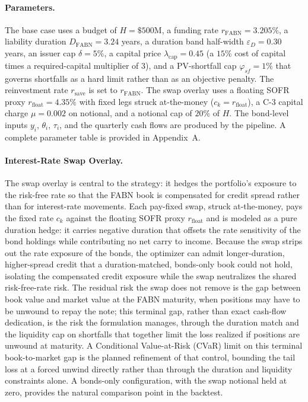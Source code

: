 \documentclass[12pt]{article}
\begin{document}
\paragraph{Parameters.} 

The base case uses a budget of $H = \$500$M, a funding rate $r_{\text{FABN}} = 3.205\%$, a liability duration $D_{\text{FABN}} = 3.24$ years, a duration band half-width $\varepsilon_D = 0.30$ years, an issuer cap $\delta = 5\%$, a capital price $\lambda_{\text{cap}} = 0.45$ (a $15\%$ cost of capital times a required-capital multiplier of $3$), and a PV-shortfall cap $\varphi_{sf} = 1\%$ that governs shortfalls as a hard limit rather than as an objective penalty. The reinvestment rate $r_{\text{save}}$ is set to $r_{\text{FABN}}$. The swap overlay uses a floating SOFR proxy $r_{\text{float}} = 4.35\%$ with fixed legs struck at-the-money ($c_k = r_{\text{float}}$), a C-3 capital charge $\mu = 0.002$ on notional, and a notional cap of $20\%$ of $H$. The bond-level inputs $y_i$, $\theta_i$, $\tau_i$, and the quarterly cash flows are produced by the pipeline. A complete parameter table is provided in Appendix~A.

\paragraph{Interest-Rate Swap Overlay.} 

The swap overlay is central to the strategy: it hedges the portfolio's exposure to the risk-free rate so that the FABN book is compensated for credit spread rather than for interest-rate movements. Each pay-fixed swap, struck at-the-money, pays the fixed rate $c_k$ against the floating SOFR proxy $r_{\text{float}}$ and is modeled as a pure duration hedge: it carries negative duration that offsets the rate sensitivity of the bond holdings while contributing no net carry to income. Because the swap strips out the rate exposure of the bonds, the optimizer can admit longer-duration, higher-spread credit that a duration-matched, bonds-only book could not hold, isolating the compensated credit exposure while the swap neutralizes the shared risk-free-rate risk. The residual risk the swap does not remove is the gap between book value and market value at the FABN maturity, when positions may have to be unwound to repay the note; this terminal gap, rather than exact cash-flow dedication, is the risk the formulation manages, through the duration match and the liquidity cap on shortfalls that together limit the loss realized if positions are unwound at maturity. A Conditional Value-at-Risk (CVaR) limit on this terminal book-to-market gap is the planned refinement of that control, bounding the tail loss at a forced unwind directly rather than through the duration and liquidity constraints alone. A bonds-only configuration, with the swap notional held at zero, provides the natural comparison point in the backtest.
\end{document}

